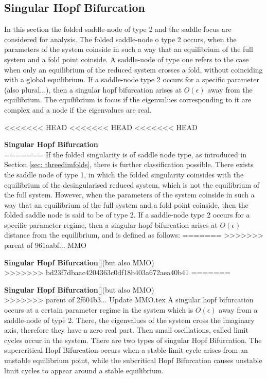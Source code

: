 \begin{theorem}
\begin{theorem}
\begin{theorem}
\subsection{Singular Hopf Bifurcation}
In this section the folded saddle-node of type 2 and the saddle focus are considered for analysis.
The folded saddle-node o type 2 occurs, when the parameters of the system coinside in such a way that an equilibrium of the full system and a fold point coinside. A saddle-node of type one refers to the case when only an equilibrium of the reduced system crosses a fold, without coinciding with a global equilibrium.
If a saddle-node type 2 occurs for a specific parameter (also plural...), then a singular hopf bifurcation arises at $O(\epsilon)$ away from the equilibrium.
The equilibrium is focus if the eigenvalues corresponding to it are complex and a node if the eigenvalues are real.

<<<<<<< HEAD
<<<<<<< HEAD
<<<<<<< HEAD
\begin{definition}{\textbf{Singular Hopf Bifurcation} \citealp{strogatz2007nonlinear}}\\
=======
If the folded singularity is of saddle node type, as introduced in Section \ref{sec: threedimfolds}, there is further classification possible.
There exists the saddle node of type 1, in which the folded singularity coinsides with the equilibrium of the desingularised reduced system, which is not the equilibrium of the full system. However, when the parameters of the system coinside in such a way that an equilibrium of the full system and a fold point coinside, then the folded saddle node is said to be of type 2. 
If a saddle-node type 2 occurs for a specific parameter regime, then a singular hopf bifurcation arises at $O(\epsilon)$ distance from the equilibrium, and is defined as follows:
=======
>>>>>>> parent of 961aabf... MMO
\begin{definition}{\textbf{Singular Hopf Bifurcation}}[\citealp{strogatz2007nonlinear}](but also MMO) \\
>>>>>>> bd23f7dbaac4204363c0df18b403a672aea40b41
=======
\begin{definition}{\textbf{Singular Hopf Bifurcation}}[\citealp{strogatz2007nonlinear}](but also MMO) \\
>>>>>>> parent of 2f604b3... Update MMO.tex
A singular hopf bifurcation occurs at a certain parameter regime in the system which is $O(\epsilon)$ away from a saddle-node of type 2. There, the eigenvalues of the system cross the imaginary axis, therefore they have a zero real part. Then small oscillations, called limit cycles occur in the system. There are two types of singular Hopf Bifurcation.
The supercritical Hopf Bifurcation occurs when a stable limit cycle arises from an unstable equilibrium point, while the subcritical Hopf Bifurcation causes unstable limit cycles to appear around a stable equilibrium.
\end{definition}


\end{definition}
\end{definition}
\end{theorem}
\end{theorem}
\end{theorem}

